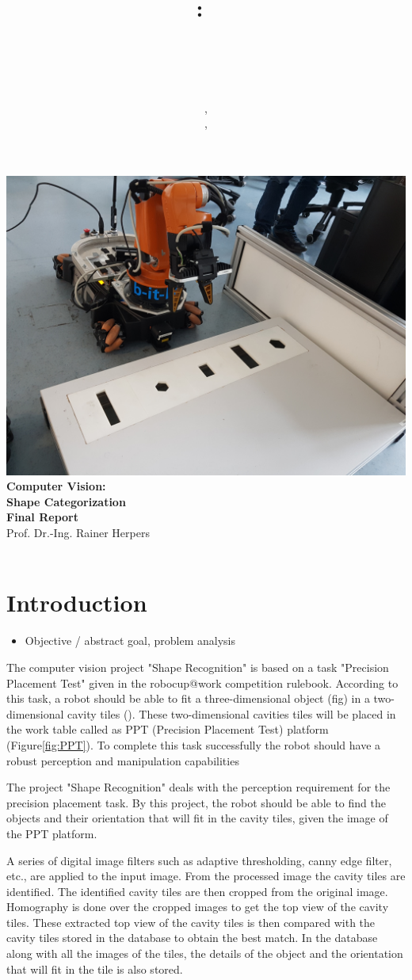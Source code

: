 \documentclass{article}
\title{
\vspace{2in}
\textmd{\textbf{\hmwkClass:\ \\ \hmwkTitle}}\\
\vspace{0.1in}\large{\hmwkClassInstructor\ }
\vspace{3in}
}
\author{\textbf{\hmwkAuthorName}, \hmwkfirstmat\\ \textbf{\hmwksecondauthor}, \hmwksecondmat}
\date{} %
\newcommand{\hmwkTitle}{Shape Categorization\\Final Report} %
\newcommand{\hmwkClass}{Computer Vision} %
\newcommand{\hmwkClassInstructor}{Prof. Dr.-Ing. Rainer Herpers} %
\newcommand{\hmwkimage}{\centering\includegraphics[draft=false, scale = 0.075]{images/FrontPicture.jpg}}
\begin{document}
\begin{titlepage}
\hmwkimage\\
\vspace{1in}
\textmd{\Huge\textbf{\hmwkClass:\ \\ \hmwkTitle}}\\
\vspace{0.1in}\large{\hmwkClassInstructor\ }
\vspace{3in}\\
\theauthor\
\thispagestyle{empty}
\end{titlepage}


\setcounter{page}{1}

\tableofcontents

\newpage


\section{Introduction}

\begin{itemize}
\item Objective / abstract goal, problem analysis
\end{itemize}

 The computer vision project "Shape Recognition" is based on a task "Precision Placement Test" given in the robocup@work competition rulebook. According to this task, a robot should be able to fit a three-dimensional object (fig) in a two-dimensional cavity tiles (). These two-dimensional cavities tiles will be placed in the work table called as PPT (Precision Placement Test) platform (Figure\ref{fig:PPT}). To complete this task successfully the robot should have a robust perception and manipulation capabilities 
 
	The project "Shape Recognition" deals with the perception requirement for the precision placement task.
By this project, the robot should be able to find the objects and their orientation that will fit in the cavity tiles, given the image of the PPT platform.

	A series of digital image filters such as adaptive thresholding, canny edge filter, etc.,  are applied to the input image. From the processed image the cavity tiles are identified. The identified cavity tiles are then cropped from the original image. Homography is done over the cropped images to get the top view of the cavity tiles. These extracted top view of the cavity tiles is then compared with the cavity tiles stored in the database to obtain the best match. In the database along with all the images of the tiles, the details of the object and the orientation that will fit in the tile is also stored. 
\end{document}
